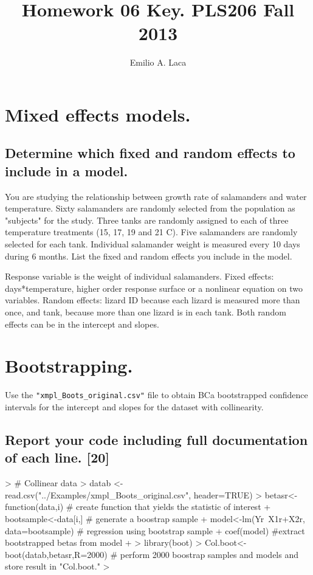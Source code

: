 \documentclass[letterpaper]{article}
\title{Homework 06 Key. PLS206 Fall 2013}
\author{Emilio A. Laca}
\begin{document}


\maketitle


\section{Mixed effects models.}

\subsection{Determine which fixed and random effects to include in a model.}

You are studying the relationship between growth rate of salamanders and water temperature. Sixty salamanders are randomly selected from the population as "subjects" for the study. Three tanks are randomly assigned to each of three temperature treatments (15, 17, 19 and 21 C). Five salamanders are randomly selected for each tank. Individual salamander weight is measured every 10 days during 6 months. List the fixed and random effects you include in the model.

Response variable is the weight of individual salamanders.
Fixed effects: days*temperature, higher order response surface or a nonlinear equation on two variables.
Random effects: lizard ID because each lizard is measured more than once, and tank, because more than one lizard is in each tank. Both random effects can be in the intercept and slopes.

\section{Bootstrapping.}


Use the \verb!"xmpl_Boots_original.csv"! file to obtain BCa bootstrapped confidence intervals for the intercept and slopes for the dataset with collinearity.


\subsection{Report your code including full documentation of each line. [20]}

\begin{Schunk}
\begin{Sinput}
> # Collinear data
> datab <- read.csv("../Examples/xmpl_Boots_original.csv", header=TRUE)
> betasr<-function(data,i){ # create function that yields the statistic of interest
+   bootsample<-data[i,] # generate a boostrap sample
+   model<-lm(Yr~X1r+X2r, data=bootsample) # regression using bootstrap sample
+   coef(model) #extract bootstrapped betas from model
+ }
> library(boot)
> Col.boot<-boot(datab,betasr,R=2000) # perform 2000 boostrap samples and models and store result in "Col.boot."
> 
\end{Sinput}
\end{Schunk}
\end{document}
